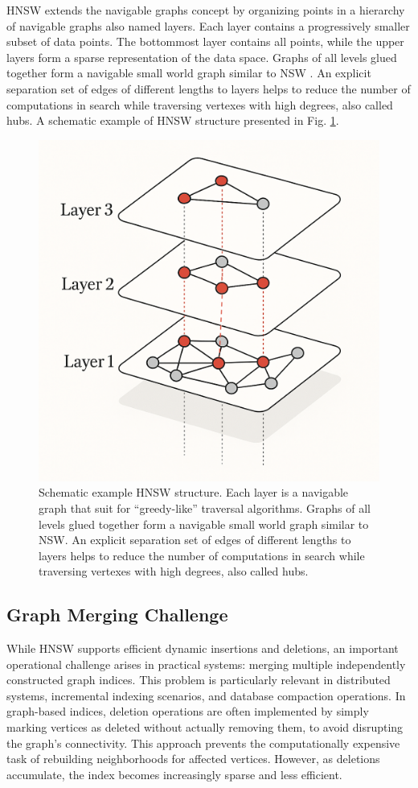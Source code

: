 \documentclass{article}
\begin{document}
HNSW \cite{hnsw} extends the navigable graphs concept by organizing points in a hierarchy of navigable graphs also named layers. Each layer contains a progressively smaller subset of data points. The bottommost layer contains all points, while the upper layers form a sparse representation of the data space. 
Graphs of all levels glued together form a navigable small world graph similar to NSW  \cite{nsw2011,nsw2012,nsw2014}. An explicit separation set of edges of different lengths to layers helps to reduce the number of computations in search while traversing vertexes with high degrees, also called hubs. A schematic example of HNSW structure presented in Fig. \ref{fig:hnsw}.

\begin{figure}
  \centering
  \includegraphics[width=0.5\linewidth]{figs/hnsw-gpt.png}
  \caption{Schematic example HNSW structure. Each layer is a navigable graph that suit for ``greedy-like'' traversal algorithms. Graphs of all levels glued together form a navigable small world graph similar to NSW. An explicit separation set of edges of different lengths to layers helps to reduce the number of computations in search while traversing vertexes with high degrees, also called hubs. }
\label{fig:hnsw}
\end{figure}

\subsection{Graph Merging Challenge}

While HNSW supports efficient dynamic insertions and deletions, an important operational challenge arises in practical systems: merging multiple independently constructed graph indices. This problem is particularly relevant in distributed systems, incremental indexing scenarios, and database compaction operations. In graph-based indices, deletion operations are often implemented by simply marking vertices as deleted without actually removing them, to avoid disrupting the graph's connectivity. This approach prevents the computationally expensive task of rebuilding neighborhoods for affected vertices. However, as deletions accumulate, the index becomes increasingly sparse and less efficient.
\end{document}
